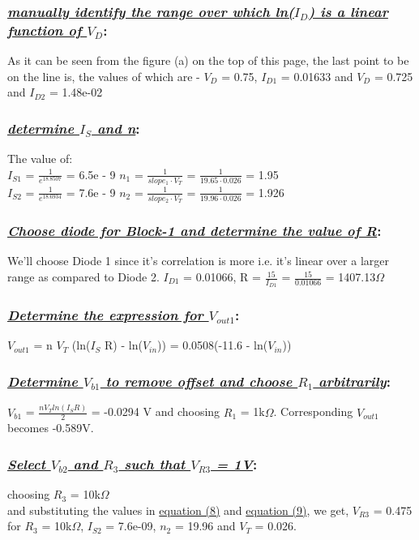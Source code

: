 \documentclass[12pt]{article}
\begin{document}
\subsubsection*{\textit{\underline{manually identify the range over which ln($I_D$) is a linear function of $V_D$}}:}
As it can be seen from the figure (a) on the top of this page, the last point to be on the line is, the values of which are - $V_D$ = 0.75, $I_{D1}$ = 0.01633 and $V_D$ = 0.725 and $I_{D2}$ = 1.48e-02

\subsubsection*{\textit{\underline{determine $I_S$ and n}}:}
The value of: \\
$I_{S1}$ = $\frac{1}{e^18.8507}$ = 6.5e - 9 \hspace{2cm} $n_1$ = $\frac{1}{slope_1\cdot V_T}$ = $\frac{1}{19.65\cdot 0.026}$ = 1.95 \\
$I_{S2}$ = $\frac{1}{e^18.6934}$ = 7.6e - 9 \hspace{2cm} $n_2$ = $\frac{1}{slope_2\cdot V_T}$ = $\frac{1}{19.96\cdot 0.026}$ = 1.926 \\

\subsubsection*{\textit{\underline{Choose diode for Block-1 and determine the value of R}}:}
We'll choose Diode 1 since it's correlation is more i.e. it's linear over a larger range as compared to Diode 2.
$I_{D1}$ = 0.01066, R = $\frac{15}{I_{D1}}$ = $\frac{15}{0.01066}$ = 1407.13$\Omega$

\subsubsection*{\textit{\underline{Determine the expression for $V_{out1}$}}:}
$V_{out1}$ = n  $V_T$  (ln($I_S$ R) - ln($V_{in}$)) = 0.0508(-11.6 - ln($V_{in}$))

\subsubsection*{\textit{\underline{Determine $V_{b1}$ to remove offset and choose $R_1$ arbitrarily}}:}
$V_{b1}$ = $\frac{n V_T ln(I_S R)}{2}$ = -0.0294 V and choosing $R_1$ = 1k$\Omega$. Corresponding $V_{out1}$ becomes -0.589V.

\subsubsection*{\textit{\underline{Select $V_{b2}$ and $R_3$ such that $V_{R3}$ = 1V}}:}
choosing $R_3$ = 10k$\Omega$\\
and substituting the values in \hyperlink{equation(8)}{equation (8)} and \hyperlink{equation(9)}{equation (9)}, we get, $V_{R3}$ = 0.475 for $R_3$ = 10k$\Omega$, $I_{S2}$ = 7.6e-09, $n_2$ = 19.96 and $V_T$ = 0.026.
\end{document}
